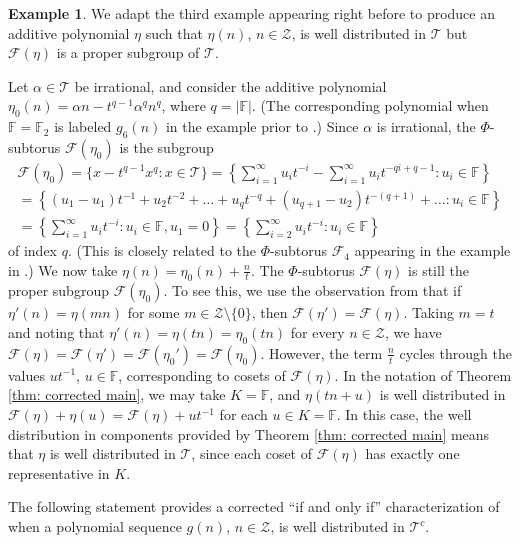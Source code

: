 \documentclass[11pt]{amsart}
\theoremstyle{theorem}
\theoremstyle{definition}
\newtheorem{example}[theorem]{Example}
\newcommand{\F}{\mathbb{F}}
\newcommand{\mZ}{\mathcal{Z}}
\newcommand{\mT}{\mathcal{T}}
\newcommand{\mF}{\mathcal{F}}
\begin{document}
\begin{example} \label{eg: finite index subtorus}
    We adapt the third example appearing right before \cite[Theorem 0.3]{bl} to produce an additive polynomial $\eta$ such that $\eta(n)$, $n \in \mZ$, is well distributed in $\mT$ but $\mF(\eta)$ is a proper subgroup of $\mT$.
    
    Let $\alpha \in \mT$ be irrational, and consider the additive polynomial $\eta_0(n) = \alpha n - t^{q-1} \alpha^q n^q$, where $q = |\F|$.
	(The corresponding polynomial when $\F = \F_2$ is labeled $g_6(n)$ in the example prior to \cite[Theorem 0.3]{bl}.)
	Since $\alpha$ is irrational, the $\Phi$-subtorus $\mF(\eta_0)$ is the subgroup
	\begin{multline*}
		\mF(\eta_0) = \{x - t^{q-1}x^q : x \in \mT\}
        = \left\{ \sum_{i=1}^{\infty} u_i t^{-i} - \sum_{i=1}^{\infty} u_i t^{-qi+q-1} : u_i \in \F \right\} \\
		 = \left\{ (u_1-u_1)t^{-1} + u_2 t^{-2} + \ldots + u_q t^{-q} + (u_{q+1} - u_2) t^{-(q+1)} + \ldots : u_i \in \F \right\} \\
		 = \left\{ \sum_{i=1}^{\infty} u_i t^{-i} : u_i \in \F, u_1 = 0 \right\}
         = \left\{ \sum_{i=2}^{\infty} u_i t^{-i} : u_i \in \F \right\}
	\end{multline*}
	of index $q$.
	(This is closely related to the $\Phi$-subtorus $\mF_4$ appearing in the example in \cite[p. 934]{bl}.)
	We now take $\eta(n) = \eta_0(n) + \frac{n}{t}$.
    The $\Phi$-subtorus $\mF(\eta)$ is still the proper subgroup $\mF(\eta_0)$.
    To see this, we use the observation from \cite[Section 7]{bl} that if $\eta'(n) = \eta(mn)$ for some $m \in \mZ \setminus \{0\}$, then $\mF(\eta') = \mF(\eta)$.
	Taking $m = t$ and noting that $\eta'(n) = \eta(tn) = \eta_0(tn)$ for every $n \in \mZ$, we have $\mF(\eta) = \mF(\eta') = \mF(\eta_0') = \mF(\eta_0)$.
    However, the term $\frac{n}{t}$ cycles through the values $ut^{-1}$, $u \in \F$, corresponding to cosets of $\mF(\eta)$.
    In the notation of Theorem \ref{thm: corrected main}, we may take $K = \F$, and $\eta(tn+u)$ is well distributed in $\mF(\eta) + \eta(u) = \mF(\eta) + ut^{-1}$ for each $u \in K = \F$.
    In this case, the well distribution in components provided by Theorem \ref{thm: corrected main} means that $\eta$ is well distributed in $\mT$, since each coset of $\mF(\eta)$ has exactly one representative in $K$.
\end{example}

The following statement provides a corrected ``if and only if'' characterization of when a polynomial sequence $g(n)$, $n \in \mZ$, is well distributed in $\mT^c$.
\end{document}
